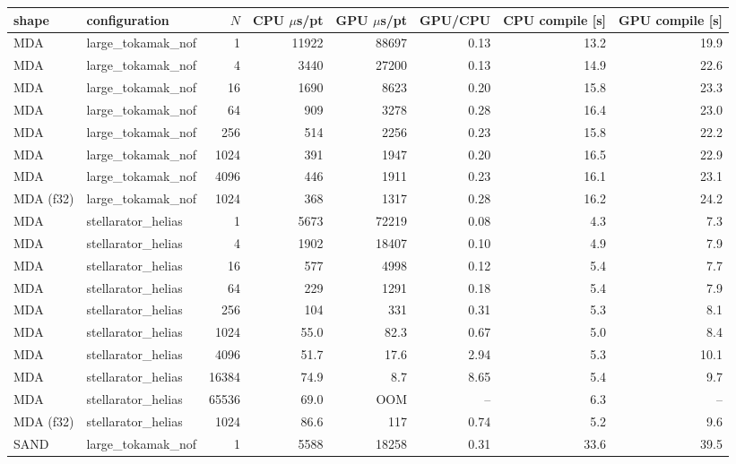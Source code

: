 \begin{tabular}{llrrrrrr}
\toprule
shape & configuration & $N$ & CPU $\mu$s/pt & GPU $\mu$s/pt & GPU/CPU & CPU compile [s] & GPU compile [s] \\
\midrule
MDA & large\_tokamak\_nof & 1 & 11922 & 88697 & 0.13 & 13.2 & 19.9 \\
MDA & large\_tokamak\_nof & 4 & 3440 & 27200 & 0.13 & 14.9 & 22.6 \\
MDA & large\_tokamak\_nof & 16 & 1690 & 8623 & 0.20 & 15.8 & 23.3 \\
MDA & large\_tokamak\_nof & 64 & 909 & 3278 & 0.28 & 16.4 & 23.0 \\
MDA & large\_tokamak\_nof & 256 & 514 & 2256 & 0.23 & 15.8 & 22.2 \\
MDA & large\_tokamak\_nof & 1024 & 391 & 1947 & 0.20 & 16.5 & 22.9 \\
MDA & large\_tokamak\_nof & 4096 & 446 & 1911 & 0.23 & 16.1 & 23.1 \\
MDA (f32) & large\_tokamak\_nof & 1024 & 368 & 1317 & 0.28 & 16.2 & 24.2 \\
MDA & stellarator\_helias & 1 & 5673 & 72219 & 0.08 & 4.3 & 7.3 \\
MDA & stellarator\_helias & 4 & 1902 & 18407 & 0.10 & 4.9 & 7.9 \\
MDA & stellarator\_helias & 16 & 577 & 4998 & 0.12 & 5.4 & 7.7 \\
MDA & stellarator\_helias & 64 & 229 & 1291 & 0.18 & 5.4 & 7.9 \\
MDA & stellarator\_helias & 256 & 104 & 331 & 0.31 & 5.3 & 8.1 \\
MDA & stellarator\_helias & 1024 & 55.0 & 82.3 & 0.67 & 5.0 & 8.4 \\
MDA & stellarator\_helias & 4096 & 51.7 & 17.6 & 2.94 & 5.3 & 10.1 \\
MDA & stellarator\_helias & 16384 & 74.9 & 8.7 & 8.65 & 5.4 & 9.7 \\
MDA & stellarator\_helias & 65536 & 69.0 & OOM & -- & 6.3 & -- \\
MDA (f32) & stellarator\_helias & 1024 & 86.6 & 117 & 0.74 & 5.2 & 9.6 \\
SAND & large\_tokamak\_nof & 1 & 5588 & 18258 & 0.31 & 33.6 & 39.5 \\

\end{tabular}
